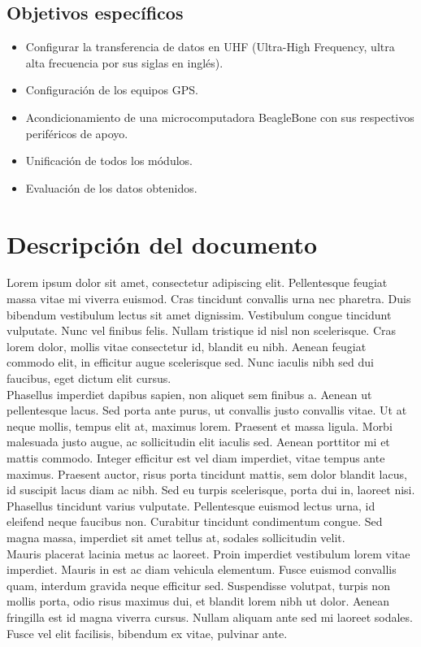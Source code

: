 \subsection{Objetivos específicos}
\begin{itemize}
    \item Configurar la transferencia de datos en UHF (Ultra-High Frequency, ultra alta frecuencia por sus siglas en inglés).
    \item Configuración de los equipos GPS.
    \item Acondicionamiento de una microcomputadora BeagleBone con sus respectivos periféricos de apoyo.
    \item Unificación de todos los módulos.
	\item Evaluación de los datos obtenidos.    
\end{itemize}

\section{Descripción del documento}

Lorem ipsum dolor sit amet, consectetur adipiscing elit. Pellentesque feugiat massa vitae mi viverra euismod. Cras tincidunt convallis urna nec pharetra. Duis bibendum vestibulum lectus sit amet dignissim. Vestibulum congue tincidunt vulputate. Nunc vel finibus felis. Nullam tristique id nisl non scelerisque. Cras lorem dolor, mollis vitae consectetur id, blandit eu nibh. Aenean feugiat commodo elit, in efficitur augue scelerisque sed. Nunc iaculis nibh sed dui faucibus, eget dictum elit cursus. \\

Phasellus imperdiet dapibus sapien, non aliquet sem finibus a. Aenean ut pellentesque lacus. Sed porta ante purus, ut convallis justo convallis vitae. Ut at neque mollis, tempus elit at, maximus lorem. Praesent et massa ligula. Morbi malesuada justo augue, ac sollicitudin elit iaculis sed. Aenean porttitor mi et mattis commodo. Integer efficitur est vel diam imperdiet, vitae tempus ante maximus. Praesent auctor, risus porta tincidunt mattis, sem dolor blandit lacus, id suscipit lacus diam ac nibh. Sed eu turpis scelerisque, porta dui in, laoreet nisi. Phasellus tincidunt varius vulputate. Pellentesque euismod lectus urna, id eleifend neque faucibus non. Curabitur tincidunt condimentum congue. Sed magna massa, imperdiet sit amet tellus at, sodales sollicitudin velit. \\

Mauris placerat lacinia metus ac laoreet. Proin imperdiet vestibulum lorem vitae imperdiet. Mauris in est ac diam vehicula elementum. Fusce euismod convallis quam, interdum gravida neque efficitur sed. Suspendisse volutpat, turpis non mollis porta, odio risus maximus dui, et blandit lorem nibh ut dolor. Aenean fringilla est id magna viverra cursus. Nullam aliquam ante sed mi laoreet sodales. Fusce vel elit facilisis, bibendum ex vitae, pulvinar ante. \\

